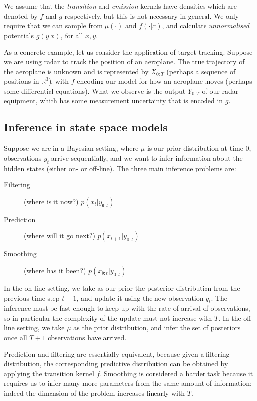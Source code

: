 \documentclass[fleqn]{article}
\begin{document}
We assume that the \emph{transition} and \emph{emission} kernels have densities which are denoted by $f$ and $g$ respectively, but this is not necessary in general.
We only require that we can sample from $\mu(\cdot)$ and $f(\cdot | x)$, and calculate \emph{unnormalised} potentials $g(y|x)$, for all $x,y$.

As a concrete example, let us consider the application of target tracking. Suppose we 
are using radar to track the position of an aeroplane. The true trajectory of the aeroplane is unknown and is represented by $X_{0:T}$ (perhaps a sequence of positions in $\mathbb{R}^3$), with $f$ encoding our model for how an aeroplane moves (perhaps some differential equations). What we observe is the output $Y_{0:T}$ of our radar equipment, which has some measurement uncertainty that is encoded in $g$.

\subsection{Inference in state space models}
Suppose we are in a Bayesian setting, where $\mu$ is our prior distribution at time 0, observations $y_t$ arrive sequentially, and we want to infer information about the hidden states (either on- or off-line).
The three main inference problems are:
\begin{description}
\item[Filtering] (where is it now?) $p(x_{t} | y_{0:t})$
\item[Prediction] (where will it go next?) $p(x_{t+1} | y_{0:t})$
\item[Smoothing] (where has it been?) $p(x_{0:t} | y_{0:t})$
\end{description}
In the on-line setting, we take as our prior the posterior distribution from the previous time step $t-1$, and update it using the new observation $y_t$. The inference must be fast enough to keep up with the rate of arrival of observations, so in particular the complexity of the update must not increase with $T$.
In the off-line setting, we take $\mu$ as the prior distribution, and infer the set of posteriors once all $T+1$ observations have arrived.

Prediction and filtering are essentially equivalent, because given a filtering distribution, the corresponding predictive distribution can be obtained by applying the transition kernel $f$.
Smoothing is considered a harder task because it requires us to infer many more parameters from the same amount of information; indeed the dimension of the problem increases linearly with $T$.
\end{document}
